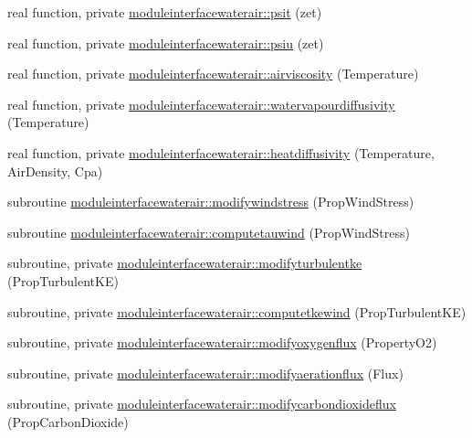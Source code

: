 \begin{DoxyCompactItemize}
\item 
real function, private \mbox{\hyperlink{namespacemoduleinterfacewaterair_a65968d6dee9f2e512ec37dd5d4fe8fe1}{moduleinterfacewaterair\+::psit}} (zet)
\item 
real function, private \mbox{\hyperlink{namespacemoduleinterfacewaterair_af976a3b281048d4f32222b16621b556a}{moduleinterfacewaterair\+::psiu}} (zet)
\item 
real function, private \mbox{\hyperlink{namespacemoduleinterfacewaterair_adc7a37061f983410896c39bb15a20517}{moduleinterfacewaterair\+::airviscosity}} (Temperature)
\item 
real function, private \mbox{\hyperlink{namespacemoduleinterfacewaterair_ad635dbe2d03621ece4e4eeb32fc65bb6}{moduleinterfacewaterair\+::watervapourdiffusivity}} (Temperature)
\item 
real function, private \mbox{\hyperlink{namespacemoduleinterfacewaterair_ab0d1bf1d73b112083b7be11d6c22aebc}{moduleinterfacewaterair\+::heatdiffusivity}} (Temperature, Air\+Density, Cpa)
\item 
subroutine \mbox{\hyperlink{namespacemoduleinterfacewaterair_a09c4f1b7db1459cc4893f784b8310831}{moduleinterfacewaterair\+::modifywindstress}} (Prop\+Wind\+Stress)
\item 
subroutine \mbox{\hyperlink{namespacemoduleinterfacewaterair_aa8b103904b5c34125450b64aeff53081}{moduleinterfacewaterair\+::computetauwind}} (Prop\+Wind\+Stress)
\item 
subroutine, private \mbox{\hyperlink{namespacemoduleinterfacewaterair_ac1f2af410795916d4c7572b0b5a8e963}{moduleinterfacewaterair\+::modifyturbulentke}} (Prop\+Turbulent\+KE)
\item 
subroutine, private \mbox{\hyperlink{namespacemoduleinterfacewaterair_afa753f72a101e83d20369a3801986adb}{moduleinterfacewaterair\+::computetkewind}} (Prop\+Turbulent\+KE)
\item 
subroutine, private \mbox{\hyperlink{namespacemoduleinterfacewaterair_ad4e148f79fe842f02dfc2fd7eb424091}{moduleinterfacewaterair\+::modifyoxygenflux}} (Property\+O2)
\item 
subroutine, private \mbox{\hyperlink{namespacemoduleinterfacewaterair_a9e9d9c5604753ebdf47d735d1c6b2fe4}{moduleinterfacewaterair\+::modifyaerationflux}} (Flux)
\item 
subroutine, private \mbox{\hyperlink{namespacemoduleinterfacewaterair_a562697e89f9cb3b375137d30b5b565eb}{moduleinterfacewaterair\+::modifycarbondioxideflux}} (Prop\+Carbon\+Dioxide)
\item 

\end{DoxyCompactItemize}
